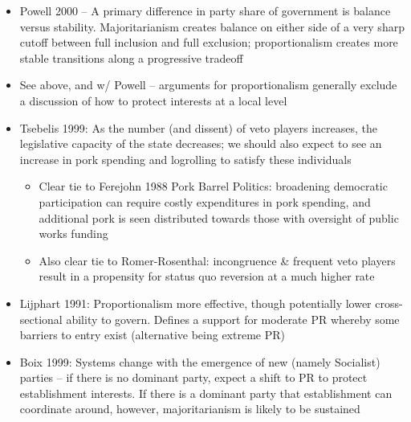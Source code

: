 \documentclass[12pt]{article}
\begin{document}
\begin{itemize}
\begin{itemize}
        \item Powell -- also connected to the strength of the opposition. A meaningful opposition implies some degree of proportionalism; if the opposition has no credible role, it is instead more relegated to a majoritarian system
        \item Powell's mandates: A mandate requires an ``identifiable prospective government'' and ``a responsively formed working majority after the election'' -- create a simplified, unidimensional policy space allowing for unbounded ation by an elected majority
    \end{itemize}
    \item Powell 2000 -- A primary difference in party share of government is balance versus stability. Majoritarianism creates balance on either side of a very sharp cutoff between full inclusion and full exclusion; proportionalism creates more stable transitions along a progressive tradeoff
    \item See above, and w/ Powell -- arguments for proportionalism generally exclude a discussion of how to protect interests at a local level
    \item Tsebelis 1999: As the number (and dissent) of veto players increases, the legislative capacity of the state decreases; we should also expect to see an increase in pork spending and logrolling to satisfy these individuals
    \begin{itemize}
        \item Clear tie to Ferejohn 1988 Pork Barrel Politics: broadening democratic participation can require costly expenditures in pork spending, and additional pork is seen distributed towards those with oversight of public works funding
        \item Also clear tie to Romer-Rosenthal: incongruence \& frequent veto players result in a propensity for status quo reversion at a much higher rate
    \end{itemize}
    \item Lijphart 1991: Proportionalism more effective, though potentially lower cross-sectional ability to govern. Defines a support for moderate PR whereby some barriers to entry exist (alternative being extreme PR)
    \item Boix 1999: Systems change with the emergence of new (namely Socialist) parties -- if there is no dominant party, expect a shift to PR to protect establishment interests. If there is a dominant party that establishment can coordinate around, however, majoritarianism is likely to be sustained
\end{itemize}
\end{document}

